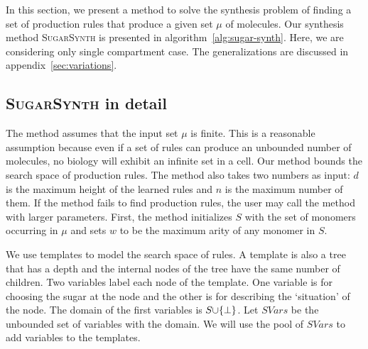 In this section, we present a method to solve the synthesis problem of finding
a set of production rules that produce a given set $\mu$ of molecules.
Our synthesis method \textsc{SugarSynth} is presented in algorithm~\ref{alg:sugar-synth}.
Here, we are considering only single compartment case.
The generalizations are discussed in appendix~\ref{sec:variations}.




\subsection{\textsc{SugarSynth} in detail}

The method assumes that the input set $\mu$ is finite.
This is a reasonable assumption because
even if a set of rules can produce
an unbounded number of molecules,
no biology will exhibit an infinite set in a cell.
Our method
bounds the search space of production rules.
The method also takes two numbers as input:
$d$ is the maximum height of the learned rules
and 
$n$ is the maximum number of them.
If the method fails to find production rules,
the user may call the method with larger parameters.
First, the method initializes $S$ with the set of monomers occurring
in $\mu$
and sets $w$ to be the maximum arity of any monomer in $S$.


We use templates to model the search space of rules.
A template is also a tree that has a depth and
the internal nodes of the tree have the same number of children.
Two variables label each node of the template.
One variable is for choosing the sugar at the node and the other is for describing
the `situation' of the node.
The domain of the first variables is $S {\cup} \{\bot\}$.
Let $SVars$ be the unbounded set of variables with the domain.
We will use the pool of $SVars$ to add variables to the templates.

